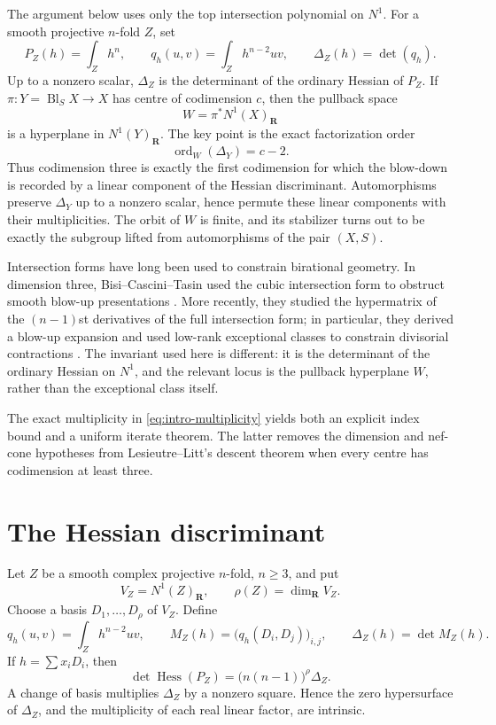 \documentclass[11pt,reqno]{amsart}
\newcommand{\R}{\mathbf R}
\DeclareMathOperator{\Bl}{Bl}
\DeclareMathOperator{\Hess}{Hess}
\DeclareMathOperator{\ord}{ord}
\theoremstyle{remark}
\begin{document}
The argument below uses only the top intersection polynomial on $N^1$.  For a smooth projective $n$-fold $Z$, set
\[
 P_Z(h)=\int_Z h^n,
 \qquad
 q_h(u,v)=\int_Z h^{n-2}uv,
 \qquad
 \Delta_Z(h)=\det(q_h).
\]
Up to a nonzero scalar, $\Delta_Z$ is the determinant of the ordinary Hessian of $P_Z$.  If $\pi\colon Y=\Bl_SX\to X$ has centre of codimension $c$, then the pullback space
\[
 W=\pi^*N^1(X)_{\R}
\]
is a hyperplane in $N^1(Y)_{\R}$.  The key point is the exact factorization order
\begin{equation}\label{eq:intro-multiplicity}
 \ord_W(\Delta_Y)=c-2.
\end{equation}
Thus codimension three is exactly the first codimension for which the blow-down is recorded by a linear component of the Hessian discriminant.  Automorphisms preserve $\Delta_Y$ up to a nonzero scalar, hence permute these linear components with their multiplicities.  The orbit of $W$ is finite, and its stabilizer turns out to be exactly the subgroup lifted from automorphisms of the pair $(X,S)$.

Intersection forms have long been used to constrain birational geometry.  In dimension three, Bisi--Cascini--Tasin used the cubic intersection form to obstruct smooth blow-up presentations \cite{BisiCasciniTasin2016}.  More recently, they studied the hypermatrix of the $(n-1)$st derivatives of the full intersection form; in particular, they derived a blow-up expansion and used low-rank exceptional classes to constrain divisorial contractions \cite[Sections~4--5]{BisiCasciniTasin2025}.  The invariant used here is different: it is the determinant of the ordinary Hessian on $N^1$, and the relevant locus is the pullback hyperplane $W$, rather than the exceptional class itself.

The exact multiplicity in \eqref{eq:intro-multiplicity} yields both an explicit index bound and a uniform iterate theorem.  The latter removes the dimension and nef-cone hypotheses from Lesieutre--Litt's descent theorem when every centre has codimension at least three.

\section{The Hessian discriminant}

Let $Z$ be a smooth complex projective $n$-fold, $n\ge3$, and put
\[
 V_Z=N^1(Z)_{\R},\qquad \rho(Z)=\dim_{\R}V_Z.
\]
Choose a basis $D_1,\ldots,D_\rho$ of $V_Z$.  Define
\begin{equation}\label{eq:Delta-def}
 q_h(u,v)=\int_Z h^{n-2}uv,
 \qquad
 M_Z(h)=\bigl(q_h(D_i,D_j)\bigr)_{i,j},
 \qquad
 \Delta_Z(h)=\det M_Z(h).
\end{equation}
If $h=\sum x_iD_i$, then
\[
 \det\Hess(P_Z)
 =\bigl(n(n-1)\bigr)^\rho\Delta_Z.
\]
A change of basis multiplies $\Delta_Z$ by a nonzero square.  Hence the zero hypersurface of $\Delta_Z$, and the multiplicity of each real linear factor, are intrinsic.
\end{document}
